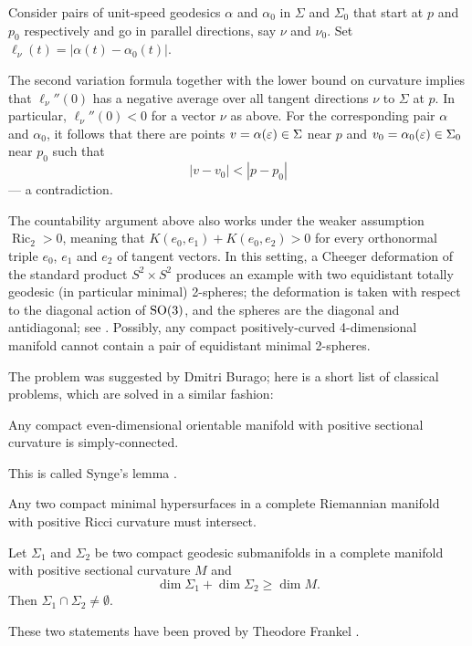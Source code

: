 Consider pairs of unit-speed geodesics $\alpha$ and $\alpha_0$
in $\Sigma$ and $\Sigma_0$
that start at $p$ and $p_0$ respectively
and go in parallel directions, say $\nu$ and $\nu_0$. %
Set $\ell_\nu(t)=|\alpha(t)-\alpha_0(t)|$.

The second variation formula together with the lower bound on curvature implies that $\ell_\nu''(0)$ has a negative average over all tangent directions $\nu$ to $\Sigma$ at $p$.
In particular, $\ell_\nu''(0)<0$ for a vector $\nu$ as above.
For the corresponding pair $\alpha$ and $\alpha_0$,
it follows that there are points $v=\alpha(\varepsilon)\in\Sigma$ near $p$ 
and $v_0=\alpha_0(\varepsilon)\in\Sigma_0$ near $p_0$
such that 
\[|v-v_0|<|p-p_0|\]
--- a contradiction.\qeds

The countability argument above also works under
the weaker assumption $\operatorname{Ric}_2>0$, meaning that $K(e_0,e_1)+K(e_0,e_2)>0$
for every orthonormal triple $e_0$, $e_1$ and $e_2$ of tangent vectors.
In this setting, a Cheeger deformation of the standard product $S^2\times S^2$ produces an example with two equidistant totally geodesic (in particular minimal) 2-spheres; the deformation is taken with respect to the diagonal action of $\mathrm{SO}(3)$, and the spheres are the diagonal and antidiagonal; see \cite{mouille}.
Possibly, any compact positively-curved 4-dimensional manifold cannot contain a pair of equidistant minimal 2-spheres.

The problem was suggested by Dmitri Burago;
here is a short list of classical problems, which are solved in a similar fashion:

\begin{pr}
Any compact even-dimensional orientable manifold with positive sectional curvature is
simply-connected.
\end{pr}

This is called Synge's lemma \cite{synge}.

\begin{pr}
Any two compact minimal hypersurfaces in a complete Riemannian manifold with positive Ricci curvature must intersect.
\end{pr}

\begin{pr}
Let $\Sigma_1$ and $\Sigma_2$ be two compact geodesic submanifolds in a complete manifold with positive sectional curvature $M$ and
\[\dim \Sigma_1+\dim \Sigma_2\ge \dim M.\] 
Then $\Sigma_1\cap\Sigma_2\ne\emptyset$.
\end{pr}

These two statements have been proved by Theodore Frankel \cite{frankel1961,frankel1966}.\label{page:frankel}

